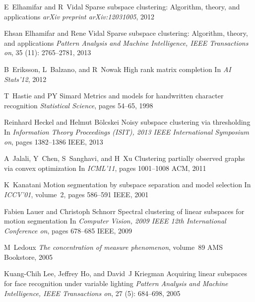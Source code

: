 \documentclass[12pt,heading]{ctexbook}
\begin{document}
\begin{thebibliography}{99}
    E~Elhamifar and R~Vidal
    \newblock Sparse subspace clustering: Algorithm, theory, and applications
    \newblock \emph{arXiv preprint arXiv:12031005}, 2012

    Ehsan Elhamifar and Rene Vidal
    \newblock Sparse subspace clustering: Algorithm, theory, and applications
    \newblock \emph{Pattern Analysis and Machine Intelligence, IEEE Transactions
    on}, 35 (11): 2765--2781, 2013

    B~Eriksson, L~Balzano, and R~Nowak
    \newblock High rank matrix completion
    \newblock In \emph{AI Stats'12}, 2012

    T~Hastie and PY Simard
    \newblock Metrics and models for handwritten character recognition
    \newblock \emph{Statistical Science}, pages 54--65, 1998

    Reinhard Heckel and Helmut B{\"o}lcskei
    \newblock Noisy subspace clustering via thresholding
    \newblock In \emph{Information Theory Proceedings (ISIT), 2013 IEEE
    International Symposium on}, pages 1382--1386 IEEE, 2013

    A~Jalali, Y~Chen, S~Sanghavi, and H~Xu
    \newblock Clustering partially observed graphs via convex optimization
    \newblock In \emph{ICML'11}, pages 1001--1008 ACM, 2011

    K~Kanatani
    \newblock Motion segmentation by subspace separation and model selection
    \newblock In \emph{ICCV'01}, volume~2, pages 586--591 IEEE, 2001

    Fabien Lauer and Christoph Schnorr
    \newblock Spectral clustering of linear subspaces for motion segmentation
    \newblock In \emph{Computer Vision, 2009 IEEE 12th International Conference
    on}, pages 678--685 IEEE, 2009

    M~Ledoux
    \newblock \emph{The concentration of measure phenomenon}, volume~89
    \newblock AMS Bookstore, 2005

    Kuang-Chih Lee, Jeffrey Ho, and David~J Kriegman
    \newblock Acquiring linear subspaces for face recognition under variable
    lighting
    \newblock \emph{Pattern Analysis and Machine Intelligence, IEEE Transactions
    on}, 27 (5): 684--698, 2005


\end{thebibliography}
\end{document}

